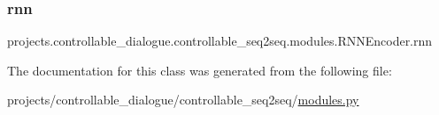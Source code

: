 \subsubsection{\texorpdfstring{rnn}{rnn}}
{\footnotesize\ttfamily projects.\+controllable\+\_\+dialogue.\+controllable\+\_\+seq2seq.\+modules.\+R\+N\+N\+Encoder.\+rnn}



The documentation for this class was generated from the following file\+:\begin{DoxyCompactItemize}
\item 
projects/controllable\+\_\+dialogue/controllable\+\_\+seq2seq/\hyperlink{projects_2controllable__dialogue_2controllable__seq2seq_2modules_8py}{modules.\+py}\end{DoxyCompactItemize}
